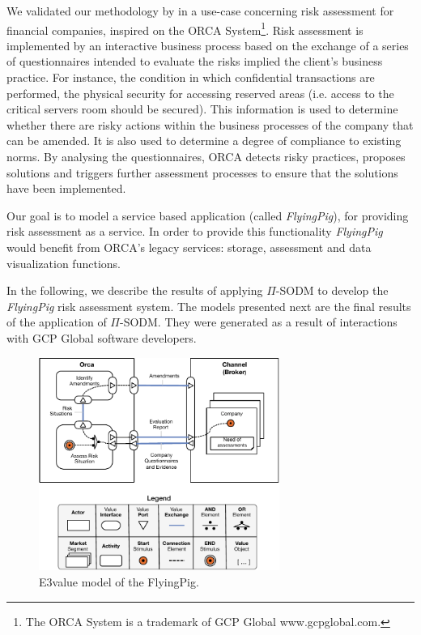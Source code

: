 We validated our methodology by in a use-case concerning risk assessment for financial companies, inspired on the ORCA System\footnote{The ORCA System is a trademark of GCP Global www.gcpglobal.com.}.
Risk assessment is implemented by an interactive business process based on the exchange of a series of questionnaires intended to evaluate the risks implied the client's business practice. 
For instance, the condition in which confidential transactions are performed, the physical security for accessing reserved areas (i.e. access to the critical servers room should be secured). 
This information is used to determine whether there are risky actions within the business processes of the company that can be amended. 
It is also used to determine a degree of compliance to existing norms. 
By analysing the questionnaires, ORCA detects risky practices, proposes solutions and triggers further assessment processes to ensure that the solutions have been implemented.

Our goal is to model a service based application (called \textsl{FlyingPig}), for providing risk assessment as a service.
In order to provide this functionality \textsl{FlyingPig} would benefit from ORCA's legacy services: storage, assessment and data visualization functions. 

In the following, we describe the results of applying $\Pi$-SODM to develop the \textsl{FlyingPig} risk assessment system.
The models presented next are the final results of the application of $\Pi$-SODM.
They were generated as a result of interactions with GCP Global software developers.

\begin{figure}
\centering
\includegraphics[width=0.7\textwidth]{figs/E3-Value.pdf}
\caption{E3value model of the FlyingPig.\label{fig:E3valuemodel}}
\end{figure}


